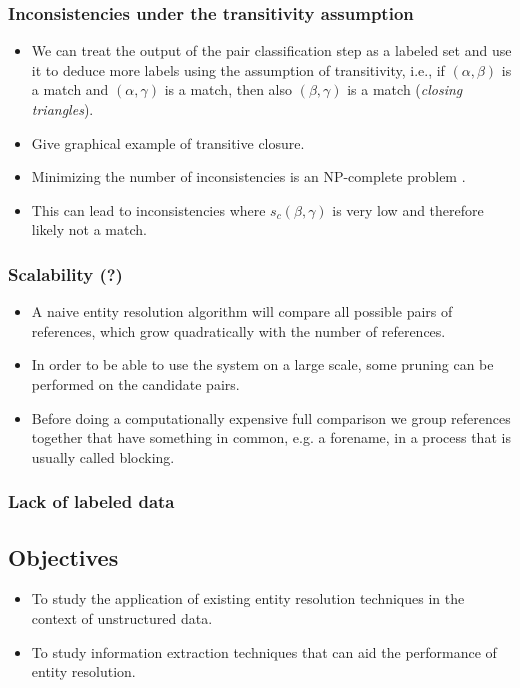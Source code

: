 \documentclass[paper=a4, fontsize=11pt]{scrartcl}
\begin{document}
\subsubsection{Inconsistencies under the transitivity assumption}
\begin{itemize}
    \item We can treat the output of the pair classification step as a labeled set and use it to deduce more labels using the assumption of transitivity, i.e., if $(\alpha, \beta)$ is a match and $(\alpha, \gamma)$ is a match, then also $(\beta, \gamma)$ is a match (\emph{closing triangles}).
    \item Give graphical example of transitive closure.
    \item Minimizing the number of inconsistencies is an NP-complete problem \cite{bansal04}.
    \item This can lead to inconsistencies where $s_c(\beta, \gamma)$ is very low and therefore likely not a match.
\end{itemize}

\subsubsection{Scalability (?)}
\begin{itemize}
	\item A naive entity resolution algorithm will compare all possible pairs of references, which grow quadratically with the number of references.
	\item In order to be able to use the system on a large scale, some pruning can be performed on the candidate pairs.
	\item Before doing a computationally expensive full comparison we group references together that have something in common, e.g. a forename, in a process that is usually called blocking.
\end{itemize}

\subsubsection{Lack of labeled data}

\subsection{Objectives}
\begin{itemize}
	\item To study the application of existing entity resolution techniques in the context of unstructured data.
	\item To study information extraction techniques that can aid the performance of entity resolution.
\end{itemize}
\end{document}
